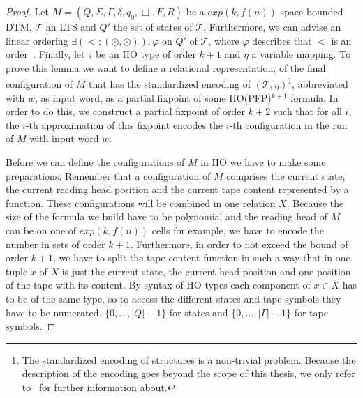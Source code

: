\begin{proof}
    Let $M = (Q, \Sigma, \Gamma, \delta, q_0, \Box, F, R)$ be a $exp(k, f(n))$ space bounded DTM, $\mathcal{T}$ an LTS and $Q'$ the set of states of $\mathcal{T}$. Furthermore, we can advise an linear ordering $\exists (< \colon (\odot, \odot)).\, \varphi$ on $Q'$ of $\mathcal{T}$, where $\varphi$ describes that $<$ is an order~\cite{fagin1974generalized}. Finally, let $\tau$ be an HO type of
    order $k + 1$ and $\eta$ a variable mapping.
    To prove this lemma we want to define a relational representation, of the final configuration of $M$ that has the standardized encoding of $(\mathcal{T}, \eta)$\footnote{The standardized encoding of structures is a non-trivial problem. Because the description of the encoding goes beyond the scope of this thesis, we only refer to~\cite{abiteboul1995computing} for further information about.}, abbreviated with $w$, as input word,
    as a partial fixpoint of some HO(PFP)$^{k+1}$ formula. 
    In order to do this, we construct a partial 
fixpoint of order $k+2$ such that for all $i$, the $i$-th approximation of 
this fixpoint encodes the $i$-th configuration in the run of $M$ with 
input word $w$.    

    Before we can define the configurations of $M$ in HO we have to make some preparations. Remember that a
    configuration of $M$ comprises the current state, the current reading head position and
    the current tape content represented by a function. These configurations will be combined in one relation $X$.
    Because the size of the formula we build have to be polynomial and the reading head of $M$ can be on
    one of $exp(k, f(n))$ cells for example, we have to encode the number in sets of order $k + 1$. Furthermore, in order to
    not exceed the bound of order $k + 1$, we have to split the tape content function in such a way that in one tuple
    $x$ of $X$ is just the current state, the current head position and one position of the tape with its content. By
    syntax of HO types each component of $x \in X$ has to be of the same type, so to access the different states and
    tape symbols they have to be numerated. $\{0, \dots, |Q| - 1\}$ for states and $\{0, \dots, |\Gamma| - 1\}$ for tape
    symbols.


\end{proof}
